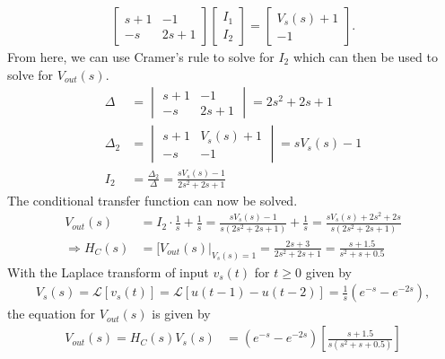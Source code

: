 \documentclass{report}
\begin{document}
\begin{solution}
    \begin{align*}
        \begin{bmatrix}
            s+1 & -1 \\
            -s & 2s+1
        \end{bmatrix}
        \begin{bmatrix}
            I_1 \\
            I_2
        \end{bmatrix} = 
        \begin{bmatrix}
            V_s(s)+1 \\
            -1
        \end{bmatrix}.
    \end{align*}
    From here, we can use Cramer's rule to solve for $I_2$ which can then be used to solve for $V_{out}(s)$.
    \begin{align*}
        \Delta &= 
        \begin{vmatrix}
            s+1 & -1 \\
            -s & 2s+1
        \end{vmatrix} 
        = 2s^2 + 2s + 1 \\[1pt]
        \Delta_2 &= 
        \begin{vmatrix}
            s+1 & V_s(s)+1 \\
            -s & -1
        \end{vmatrix} 
        = sV_s(s) - 1 \\[1pt]
        I_2 &= \frac{\Delta_2}{\Delta} = \frac{sV_s(s)-1}{2s^2+2s+1}
    \end{align*}
    The conditional transfer function can now be solved.
    \begin{align*}
        V_{out}(s) &= I_2\cdot \frac{1}{s} + \frac{1}{s} = \frac{sV_s(s)-1}{s(2s^2+2s+1)} + \frac{1}{s} = \frac{sV_s(s)+2s^2+2s}{s(2s^2+2s+1)} \\
        \Longrightarrow H_C(s) &= [V_{out}(s)\big|_{V_s(s)=1} = \frac{2s+3}{2s^2+2s+1} = \frac{s+1.5}{s^2+s+0.5}
    \end{align*}
    With the Laplace transform of input $v_s(t)$ for $t\geq 0$ given by 
    \begin{align*}
        V_s(s)=\mathcal{L}[v_s(t)]=\mathcal{L}[u(t-1)-u(t-2)]=\frac{1}{s}(e^{-s}-e^{-2s}),
    \end{align*}
    the equation for $V_{out}(s)$ is given by
    \begin{align*}
        V_{out}(s) = H_C(s)V_s(s) &= (e^{-s}-e^{-2s})\left[\frac{s+1.5}{s(s^2+s+0.5)}\right] \\ 

\end{align*}
\end{solution}
\end{document}
